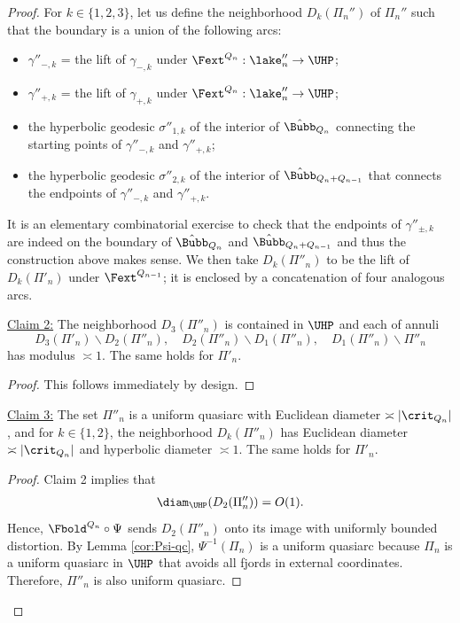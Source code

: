\documentclass{amsart}
\begin{document}
\begin{proof}
    For $k \in \{1,2,3\}$, let us define the neighborhood $D_k(\Pi_n'')$ of $\Pi_n''$ such that the boundary is a union of the following arcs:
        \begin{itemize}
            \item $\gamma''_{-,k}$ = the lift of $\gamma_{-,k}$ under $\Fext^{Q_n} : \lake''_n \to \UHP$;
            \item $\gamma''_{+,k}$ = the lift of $\gamma_{+,k}$ under $\Fext^{Q_n} : \lake''_n \to \UHP$;
            \item the hyperbolic geodesic $\sigma''_{1,k}$ of the interior of $\hat{\Bubb}_{Q_{n}}$ connecting the starting points of $\gamma''_{-,k}$ and $\gamma''_{+,k}$;
            \item the hyperbolic geodesic $\sigma''_{2,k}$ of the interior of $\hat{\Bubb}_{Q_n+Q_{n-1}}$ that connects the endpoints of $\gamma''_{-,k}$ and $\gamma''_{+,k}$.
        \end{itemize}
    It is an elementary combinatorial exercise to check that the endpoints of $\gamma''_{\pm,k}$ are indeed on the boundary of $\hat{\Bubb}_{Q_n}$ and $\hat{\Bubb}_{Q_{n}+Q_{n-1}}$ and thus the construction above makes sense.
    We then take $D_k(\Pi''_n)$ to be the lift of $D_k(\Pi'_n)$ under $\Fext^{Q_{n-1}}$; it is enclosed by a concatenation of four analogous arcs.
    \vspace{0.1in}
    
    \noindent \underline{Claim 2:}
    The neighborhood $D_3(\Pi''_n)$ is contained in $\UHP$ and each of annuli 
    \[
    D_3(\Pi'_n) \backslash D_2(\Pi''_n), \quad D_2(\Pi''_n) \backslash D_1(\Pi''_n), \quad D_1(\Pi''_n) \backslash \Pi''_n
    \]
    has modulus $\asymp 1$.
    The same holds for $\Pi'_n$.

    \begin{proof}
        This follows immediately by design.
    \end{proof}

    \noindent \underline{Claim 3:}
    The set $\Pi''_n$ is a uniform quasiarc with Euclidean diameter $\asymp |\crit_{Q_n}|$, and for $k \in \{1,2\}$, the neighborhood $D_k(\Pi''_n)$ has Euclidean diameter $\asymp |\crit_{Q_n}|$ and hyperbolic diameter $\asymp 1$.
    The same holds for $\Pi'_n$.

    \begin{proof}
        Claim 2 implies that
        \begin{align}
        \label{eqn:hyp-diam-lower-bound}
            \diam_{\UHP}(D_2(\Pi''_n)) = O(1).
        \end{align}
        Hence, $\Fbold^{Q_n} \circ \Psi$ sends $D_2(\Pi''_n)$ onto its image with uniformly bounded distortion.
        By Lemma \ref{cor:Psi-qc}, $\Psi^{-1}(\Pi_n)$ is a uniform quasiarc because $\Pi_n$ is a uniform quasiarc in $\UHP$ that avoids all fjords in external coordinates.
        Therefore, $\Pi''_n$ is also uniform quasiarc.
    

\end{proof}
\end{proof}
\end{document}
